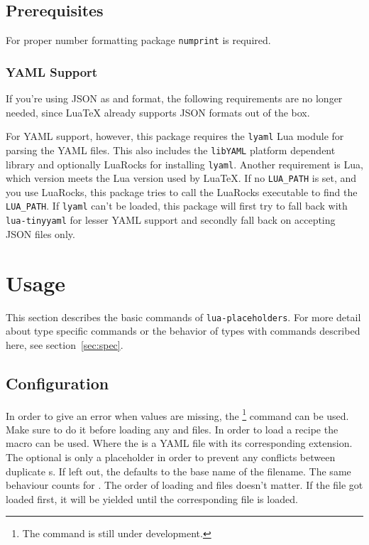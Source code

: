 \documentclass{ltxdoc}
\begin{document}
    \subsection{Prerequisites}
    For proper number formatting package \texttt{numprint}\cite{numprint} is required.

    \subsubsection{YAML Support}
    If you're using JSON as  and  format, the following requirements are no longer needed, since Lua\TeX{} already supports JSON formats out of the box.

    For YAML support, however, this package requires the \texttt{lyaml}\cite{lyaml} Lua module for parsing the YAML files.
    This also includes the \texttt{libYAML}\cite{libYAML} platform dependent library and optionally LuaRocks for installing \texttt{lyaml}.
    Another requirement is Lua, which version meets the Lua version used by Lua\TeX{}.
    If no \texttt{LUA\_PATH} is set, and you use LuaRocks, this package tries to call the LuaRocks executable to find the \texttt{LUA\_PATH}.
    If \texttt{lyaml} can't be loaded, this package will first try to fall back with \texttt{lua-tinyyaml}\cite{lua-tinyyaml} for lesser YAML support and secondly fall back on accepting JSON files only.

    \clearpage
    \section{Usage}
    This section describes the basic commands of \texttt{lua-placeholders}.
    For more detail about type specific commands or the behavior of types with commands described here, see section~\ref{sec:spec}.\\

    \subsection{Configuration}
    \DescribeMacro{\strictparams} In order to give an error when values are missing, the \cmd{\strictparams}\footnote{The \cmd{\strictparams} command is still under development.} command can be used.
    Make sure to do it before loading any  and  files.
    \DescribeMacro{\loadrecipe}
    In order to load a recipe the macro \cmd{\loadrecipe} can be used.
    Where the  is a YAML file with its corresponding extension.
    The optional  is only a placeholder in order to prevent any conflicts between duplicate s.
    If left out, the  defaults to the base name of the filename.
    \DescribeMacro{\loadpayload} The same behaviour counts for \cmd{\loadpayload}.
    The order of loading  and  files doesn't matter.
    If the  file got loaded first, it will be yielded until the corresponding  file is loaded.
\end{document}
